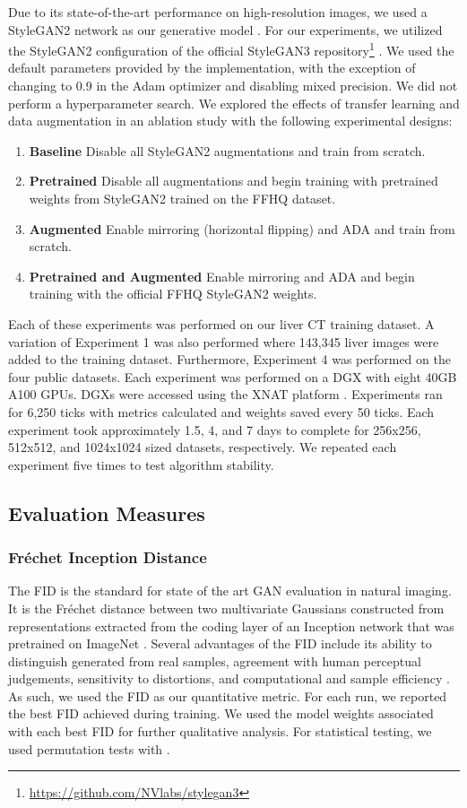 \documentclass[runningheads]{llncs}
\begin{document}
Due to its state-of-the-art performance on high-resolution images, we used a StyleGAN2 network as our generative model \cite{Karras2020_2}.
For our experiments, we utilized the StyleGAN2 configuration of the official StyleGAN3 repository\footnote{\url{https://github.com/NVlabs/stylegan3}} \cite{Karras2021}.
We used the default parameters provided by the implementation, with the exception of changing  to 0.9 in the Adam optimizer and disabling mixed precision.
We did not perform a hyperparameter search.
We explored the effects of transfer learning and data augmentation in an ablation study with the following experimental designs:
\begin{enumerate}
    \item \textbf{Baseline} Disable all StyleGAN2 augmentations and train from scratch.
    \item \textbf{Pretrained} Disable all augmentations and begin training with pretrained weights from StyleGAN2 trained on the FFHQ dataset.
    \item \textbf{Augmented} Enable mirroring (horizontal flipping) and ADA and train from scratch.
    \item \textbf{Pretrained and Augmented} Enable mirroring and ADA and begin training with the official FFHQ StyleGAN2 weights.
\end{enumerate}
Each of these experiments was performed on our liver CT training dataset.
A variation of Experiment 1 was also performed where 143,345 liver images were added to the training dataset.
Furthermore, Experiment 4 was performed on the four public datasets.
Each experiment was performed on a DGX with eight 40GB A100 GPUs.
DGXs were accessed using the XNAT platform \cite{marcus2007}.
Experiments ran for 6,250 ticks with metrics calculated and weights saved every 50 ticks.
Each experiment took approximately 1.5, 4, and 7 days to complete for 256x256, 512x512, and 1024x1024 sized datasets, respectively.
We repeated each experiment five times to test algorithm stability.

\subsection{Evaluation Measures}

\subsubsection{Fr\'{e}chet Inception Distance}

The FID is the standard for state of the art GAN evaluation in natural imaging.
It is the Fr\'{e}chet distance between two multivariate Gaussians constructed from representations extracted from the coding layer of an Inception network that was pretrained on ImageNet \cite{Heusel2017}.
Several advantages of the FID include its ability to distinguish generated from real samples, agreement with human perceptual judgements, sensitivity to distortions, and computational and sample efficiency \cite{borji2019,Heusel2017}.
As such, we used the FID as our quantitative metric.
For each run, we reported the best FID achieved during training.
We used the model weights associated with each best FID for further qualitative analysis.
For statistical testing, we used permutation tests with .
\end{document}
